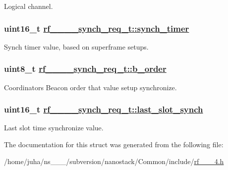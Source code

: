 Logical channel. \hypertarget{structrf__802__15__4__synch__req__t_cebd13aabb32a619c972e9edbf9b26f2}{
\subsubsection[synch\_\-timer]{\setlength{\rightskip}{0pt plus 5cm}uint16\_\-t \hyperlink{structrf__802__15__4__synch__req__t_cebd13aabb32a619c972e9edbf9b26f2}{rf\_\_\_\_\-synch\_\-req\_\-t::synch\_\-timer}}}
\label{structrf__802__15__4__synch__req__t_cebd13aabb32a619c972e9edbf9b26f2}


Synch timer value, based on superframe setups. \hypertarget{structrf__802__15__4__synch__req__t_a9ae4f231cda108988b95407c9053888}{
\subsubsection[b\_\-order]{\setlength{\rightskip}{0pt plus 5cm}uint8\_\-t \hyperlink{structrf__802__15__4__synch__req__t_a9ae4f231cda108988b95407c9053888}{rf\_\_\_\_\-synch\_\-req\_\-t::b\_\-order}}}
\label{structrf__802__15__4__synch__req__t_a9ae4f231cda108988b95407c9053888}


Coordinators Beacon order that value setup synchronize. \hypertarget{structrf__802__15__4__synch__req__t_82ae23950d975bb6d356beaf05bbab50}{
\subsubsection[last\_\-slot\_\-synch]{\setlength{\rightskip}{0pt plus 5cm}uint16\_\-t \hyperlink{structrf__802__15__4__synch__req__t_82ae23950d975bb6d356beaf05bbab50}{rf\_\_\_\_\-synch\_\-req\_\-t::last\_\-slot\_\-synch}}}
\label{structrf__802__15__4__synch__req__t_82ae23950d975bb6d356beaf05bbab50}


Last slot time synchronize value. 

The documentation for this struct was generated from the following file:\begin{CompactItemize}
\item 
/home/juha/ns\_\_\_/subversion/nanostack/Common/include/\hyperlink{rf__802__15__4_8h}{rf\_\_\_\-4.h}\end{CompactItemize}
